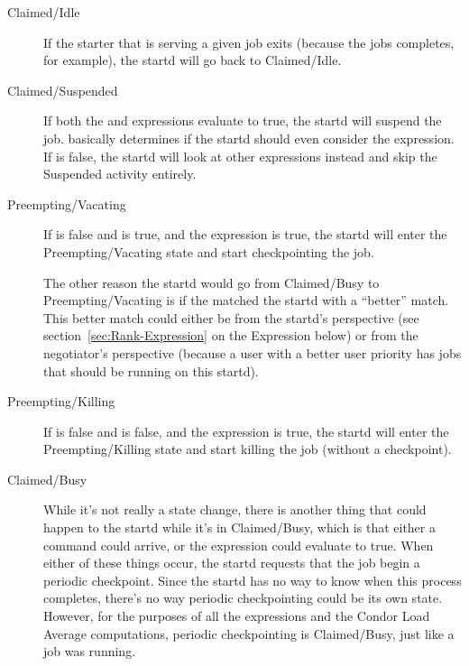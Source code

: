 \begin{description}
  
\item[Claimed/Idle] If the starter that is serving a given job exits
  (because the jobs completes, for example), the startd will go back
  to Claimed/Idle.
  
\item[Claimed/Suspended] If both the  and
   expressions evaluate to true, the startd will suspend
  the job.   basically determines if the startd
  should even consider the  expression.  If
   is false, the startd will look at other
  expressions instead and skip the Suspended activity entirely.
  
\item[Preempting/Vacating] If  is false and
   is true, and the  expression is
  true, the startd will enter the Preempting/Vacating state and start
  checkpointing the job.
  
  The other reason the startd would go from Claimed/Busy to
  Preempting/Vacating is if the  matched the startd
  with a ``better'' match.  This better match could either be from the
  startd's perspective (see section~\ref{sec:Rank-Expression} on the
   Expression below) or from the negotiator's perspective
  (because a user with a better user priority has jobs that should be
  running on this startd).
  
\item[Preempting/Killing] If  is false and
   is false, and the  expression is
  true, the startd will enter the Preempting/Killing state and start
  killing the job (without a checkpoint).
  
\item[Claimed/Busy] While it's not really a state change, there is
  another thing that could happen to the startd while it's in
  Claimed/Busy, which is that either a  command
  could arrive, or the  expression could
  evaluate to true.  When either of these things occur, the startd
  requests that the job begin a periodic checkpoint.  Since the startd
  has no way to know when this process completes, there's no way
  periodic checkpointing could be its own state.  However, for the
  purposes of all the expressions and the Condor Load Average
  computations, periodic checkpointing is Claimed/Busy, just like a
  job was running.

\end{description}

